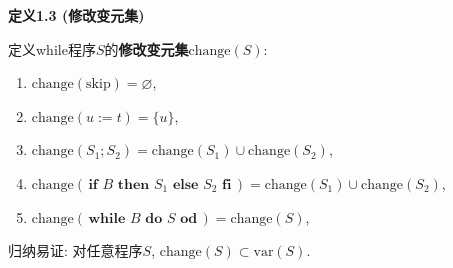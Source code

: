 \documentclass[UTF8]{ctexart}
\begin{document}
\vspace{10pt}

\hypertarget{sec:定义1.3}{}
\noindent\textbf{定义1.3 (修改变元集)}

定义while程序$S$的\textbf{修改变元集}$\mathrm{change}(S)$:
\begin{enumerate}
    \item $\mathrm{change}(\mathrm{skip})=\varnothing$,
    \item $\mathrm{change}(u:=t)=\{u\}$,
    \item $\mathrm{change}(S_1;S_2)=\mathrm{change}(S_1)\cup\mathrm{change}(S_2)$,
    \item $\mathrm{change}(\,\mathbf{if}\,\,B\,\,\mathbf{then}\,\,S_1\,\,
    \mathbf{else}\,\,S_2\,\,\mathbf{fi}\,)=
    \mathrm{change}(S_1)\cup\mathrm{change}(S_2)$,
    \item $\mathrm{change}(\,\mathbf{while}\,\,B\,\,\mathbf{do}\,\,S
    \,\,\mathbf{od}\,)=\mathrm{change}(S)$,
\end{enumerate}

\vspace{10pt}

归纳易证: 对任意程序$S$, $\mathrm{change}(S)\subset\mathrm{var}(S)$.
\end{document}
